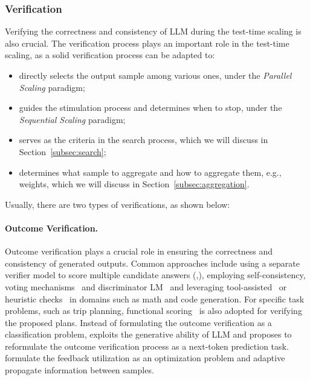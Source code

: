 
\subsubsection{Verification}
\label{subsec:verification}
Verifying the correctness and consistency of LLM during the test-time scaling is also crucial. The verification process plays an important role in the test-time scaling, as a solid verification process can be adapted to: 
\begin{itemize}
    \item directly selects the output sample among various ones, under the \textit{Parallel Scaling} paradigm;
    \item guides the stimulation process and determines when to stop, under the \textit{Sequential Scaling} paradigm;
    \item serves as the criteria in the search process, which we will discuss in Section~\ref{subsec:search};
    \item determines what sample to aggregate and how to aggregate them, e.g., weights, which we will discuss in Section~\ref{subsec:aggregation}.
\end{itemize}
Usually, there are two types of verifications, as shown below:

\paragraph{Outcome Verification.}
Outcome verification plays a crucial role in ensuring the correctness and consistency of generated outputs. Common approaches include using a separate verifier model to score multiple candidate answers (\eg,\citet{cobbe2021training}), employing self-consistency, voting mechanisms~\citep{wang2023selfconsistency} and discriminator LM~\citep{chen2024tree} and leveraging tool-assisted~\citep{gou2024critic} or heuristic checks~\citep{deepseek-r1} in domains such as math and code generation. 
For specific task problems, such as trip planning, functional scoring~\citep{lee2025evolvingdeeperllmthinking} is also adopted for verifying the proposed plans. 
Instead of formulating the outcome verification as a classification problem, \citet{zhang2025generativeverifiersrewardmodeling} exploits the generative ability of LLM and proposes to reformulate the outcome verification process as a next-token prediction task.
\citet{li2025learningreasonfeedbacktesttime} formulate the feedback utilization as an optimization problem and adaptive propagate information between samples.

